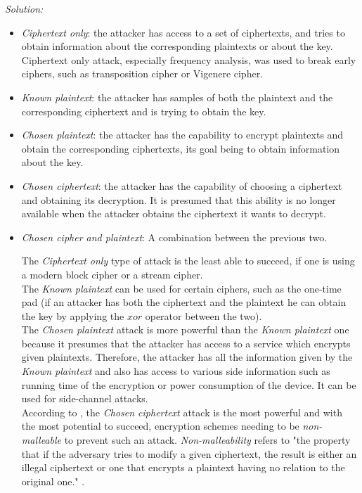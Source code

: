 \documentclass[a4paper,11pt]{article}
\newcommand{\includeonlyinsolution}[1]{\ifsolution#1\fi}
\newenvironment{solution}%
{\par{\noindent\small\textit{Solution:}}\vspace{-12pt}\begin{framed}}%
{\end{framed}\par}
\begin{document}
\begin{enumerate}[(a)]
\includeonlyinsolution{\begin{solution}
\begin{itemize}
  \item \emph{Ciphertext only}: the attacker has access to a set of ciphertexts, and tries to obtain
  information about the corresponding plaintexts or about the key. Ciphertext only attack, especially
  frequency analysis, was used to break early ciphers, such as transposition cipher or Vigenere cipher.
  \item \emph{Known plaintext}: the attacker has samples of both the plaintext and the corresponding
  ciphertext and is trying to obtain the key.
  \item \emph{Chosen plaintext}: the attacker has the capability to encrypt plaintexts and obtain
  the corresponding ciphertexts, its goal being to obtain information about the key.
  \item \emph{Chosen ciphertext}: the attacker has the capability of choosing a ciphertext and obtaining
  its decryption. It is presumed that this ability is no longer available when the attacker obtains
  the ciphertext it wants to decrypt.
  \item \emph{Chosen cipher and plaintext}: A combination between the previous two.

  The {\em Ciphertext only} type of attack is the least able to succeed, if one is using a modern
  block cipher or a stream cipher.\\
  The {\em Known plaintext} can be used for certain ciphers, such as the one-time pad (if an attacker
  has both the ciphertext and the plaintext he can obtain the key by applying the $xor$ operator
  between the two).\\
  The {\em Chosen plaintext} attack is more powerful than the {\em Known plaintext} one because it
  presumes that the attacker has access to a service which encrypts given plaintexts. Therefore, the
  attacker has all the information given by the {\em Known plaintext} and also has access to various
  side information such as running time of the encryption or power consumption of the device. It can
  be used for side-channel attacks.\\
  According to \cite{ModernCrypt}, the {\em Chosen ciphertext} attack is the most powerful and with
  the most potential to succeed, encryption schemes needing to be \emph{non-malleable} to prevent
  such an attack. \emph{Non-malleability} refers to "the property that if the adversary tries to
  modify a given ciphertext, the result is either an illegal ciphertext or one that encrypts a plaintext
  having no relation to the original one." \cite{ModernCrypt}.
\end{itemize}
\end{solution}}
\end{enumerate}
\end{document}
